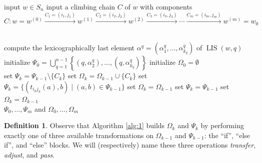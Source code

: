 \documentclass[11pt]{amsart}
\theoremstyle{definition}
\newtheorem{definition}[theorem]{Definition}
\theoremstyle{named}
\DeclareMathOperator{\LIS}{\mathrm{LIS}}
\begin{document}
	\begin{algorithm}
		\caption{}
		\label{alg:1}
		\begin{algorithmic}
			\State input $w\in S_n$
			\State input a climbing chain $C$ of $w$ with components
			\[C: w=w^{(0)} \xrightarrow{C_1=(i_1,j_1)} w^{(1)} \xrightarrow{C_2=(i_2,j_2)} w^{(2)}\xrightarrow{C_3=(i_3,j_3)}\cdots\xrightarrow{C_m=(i_m,j_m)} w^{(m)} = w_0\]
			
			\\
				\State compute the lexicographically last element $\alpha^{q}=(\alpha^q_1,\ldots,\alpha^q_{k_q})$ of $\LIS(w,q)$ 
			\EndFor
			\State initialize $\Psi_0 = \bigcup_{q=1}^{n-1}\left\{(q,\alpha^q_2),\ldots,(q,\alpha^q_{k_q}) \right\}$
			\State initialize $\Omega_0=\emptyset$
			\\

					\State set $\Psi_k=\Psi_{k-1}\setminus\{C_k\}$
					\State set $\Omega_k = \Omega_{k-1}\cup\{C_k\}$
					\State set $\Psi_k=\{(t_{i_kj_k}(a), b) \mid (a,b)\in \Psi_{k-1} \}$
					\State set $\Omega_k=\Omega_{k-1}$
				\Else
					\State set $\Psi_k=\Psi_{k-1}$
					\State set $\Omega_k = \Omega_{k-1}$
				\EndIf
			\EndFor\\
			\Return $\Psi_0,\ldots,\Psi_m$ and $\Omega_0,\ldots,\Omega_m$
		\end{algorithmic}
	\end{algorithm}
\pagebreak
	\begin{definition}
		Observe that Algorithm \ref{alg:1} builds $\Omega_k$ and $\Psi_k$ by performing exactly one of three available transformations on $\Omega_{k-1}$ and $\Psi_{k-1}$: the ``if'', ``else if'', and ``else'' blocks. We will (respectively) name these three operations \emph{transfer}, \emph{adjust}, and \emph{pass}.
	\end{definition}
\end{document}
